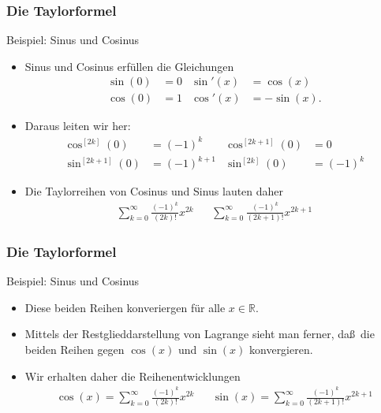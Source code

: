 \documentclass{beamer}
\newcommand\RR{\mathbb R}
\newcommand{\ue}{\"u}
\newcommand{\mytitle}{Die Taylorformel}
\begin{document}
\begin{frame}\frametitle{\mytitle}
	\begin{block}{Beispiel: Sinus und Cosinus}
	\begin{itemize}
		\item Sinus und Cosinus erf\ue llen die Gleichungen
			\begin{align*}
				\sin(0)&=0&\sin'(x)&=\cos(x)\\
				\cos(0)&=1&\cos'(x)&=-\sin(x).
			\end{align*}
		\item Daraus leiten wir her:
			\begin{align*}
				\cos^{[2k]}(0)&=(-1)^k&\cos^{[2k+1]}(0)&=0\\
				\sin^{[2k+1]}(0)&=(-1)^{k+1}&\sin^{[2k]}(0)&=(-1)^k
			\end{align*}
		\item Die Taylorreihen von Cosinus und Sinus lauten daher
			\begin{align*}
				\sum_{k=0}^\infty\frac{(-1)^k}{(2k)!}x^{2k}&&
				\sum_{k=0}^\infty\frac{(-1)^{k}}{(2k+1)!}x^{2k+1}
			\end{align*}
	\end{itemize}
	\end{block}
\end{frame}

\begin{frame}\frametitle{\mytitle}
	\begin{block}{Beispiel: Sinus und Cosinus}
	\begin{itemize}
		\item Diese beiden Reihen konveriergen f\ue r alle $x\in\RR$.
		\item Mittels der Restglieddarstellung von Lagrange sieht man ferner, da\ss\ die beiden Reihen gegen $\cos(x)$ und $\sin(x)$ konvergieren.
		\item Wir erhalten daher die Reihenentwicklungen
			\begin{align*}
				\cos(x)=\sum_{k=0}^\infty\frac{(-1)^k}{(2k)!}x^{2k}&&
				\sin(x)=\sum_{k=0}^\infty\frac{(-1)^{k}}{(2k+1)!}x^{2k+1}
			\end{align*}
	\end{itemize}
	\end{block}
\end{frame}
\end{document}
